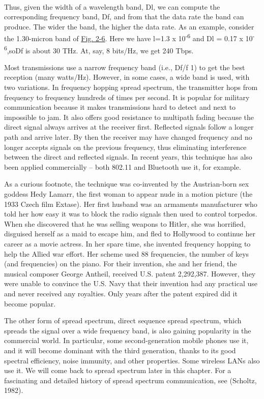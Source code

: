\documentclass[b5paper,11pt]{memoir}
\begin{document}

~

Thus, given the width of a wavelength band, {D}{l}, we can compute the
corresponding frequency band, {D}{f}, and from that the data rate the
band can produce. The wider the band, the higher the data rate. As an
example, consider the 1.30-micron band of
\protect\hyperlink{0130661023_ch02lev1sec2.htmlux5cux23ch02fig06}{Fig.
2-6}. Here we have {l}=1.3 x 10\textsuperscript{-6} and {D}{l} = 0.17 x
10\textsuperscript{-6},so{D}{f} is about 30 THz. At, say, 8 bits/Hz, we
get 240 Tbps.

Most transmissions use a narrow frequency band (i.e., {D}{f/f}
 1) to get the best reception (many
watts/Hz). However, in some cases, a wide band is used, with two
variations. In {frequency hopping spread spectrum}, the transmitter hops
from frequency to frequency hundreds of times per second. It is popular
for military communication because it makes transmissions hard to detect
and next to impossible to jam. It also offers good resistance to
multipath fading because the direct signal always arrives at the
receiver first. Reflected signals follow a longer path and arrive later.
By then the receiver may have changed frequency and no longer accepts
signals on the previous frequency, thus eliminating interference between
the direct and reflected signals. In recent years, this technique has
also been applied commercially -- both 802.11 and Bluetooth use it, for
example.

As a curious footnote, the technique was co-invented by the
Austrian-born sex goddess Hedy Lamarr, the first woman to appear nude in
a motion picture (the 1933 Czech film {Extase}). Her first husband was
an armaments manufacturer who told her how easy it was to block the
radio signals then used to control torpedos. When she discovered that he
was selling weapons to Hitler, she was horrified, disguised herself as a
maid to escape him, and fled to Hollywood to continue her career as a
movie actress. In her spare time, she invented frequency hopping to help
the Allied war effort. Her scheme used 88 frequencies, the number of
keys (and frequencies) on the piano. For their invention, she and her
friend, the musical composer George Antheil, received U.S. patent
2,292,387. However, they were unable to convince the U.S. Navy that
their invention had any practical use and never received any royalties.
Only years after the patent expired did it become popular.

The other form of spread spectrum, {direct sequence spread spectrum},
which spreads the signal over a wide frequency band, is also gaining
popularity in the commercial world. In particular, some
second-generation mobile phones use it, and it will become dominant with
the third generation, thanks to its good spectral efficiency, noise
immunity, and other properties. Some wireless LANs also use it. We will
come back to spread spectrum later in this chapter. For a fascinating
and detailed history of spread spectrum communication, see (Scholtz,
1982).
\end{document}
